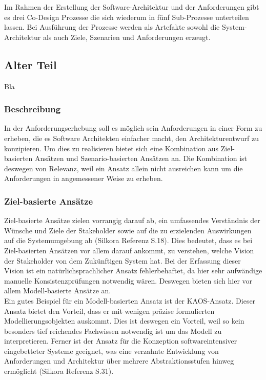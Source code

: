 Im Rahmen der Erstellung der Software-Architektur und der Anforderungen gibt es drei Co-Design Prozesse die sich wiederum in fünf Sub-Prozesse unterteilen lassen. Bei Ausführung der Prozesse werden als Artefakte sowohl die System-Architektur als auch Ziele, Szenarien und Anforderungen erzeugt. \\

\subsection{Alter Teil}
Bla\\

\subsubsection{Beschreibung}
In der Anforderungserhebung soll es m\"oglich sein Anforderungen in einer Form zu erheben, die es Software Architekten einfacher macht, den Architekturentwurf zu konzipieren. Um dies zu realisieren bietet sich eine Kombination aus Ziel-basierten Ans\"atzen und Szenario-basierten Ans\"atzen an. Die Kombination ist deswegen von Relevanz, weil ein Ansatz allein nicht ausreichen kann um die Anforderungen in angemessener Weise zu erheben.\\

\subsubsection{Ziel-basierte Ans\"atze}
Ziel-basierte Ans\"atze zielen vorrangig darauf ab, ein umfassendes Verst\"andnis der W\"unsche und Ziele der Stakeholder sowie auf die zu erzielenden Auswirkungen auf die Systemumgebung ab (Silkora Referenz S.18). Dies bedeutet, dass es bei Ziel-basierten Ans\"atzen vor allem darauf ankommt, zu verstehen, welche Vision der Stakeholder von dem Zuk\"unftigen System hat. Bei der Erfassung dieser Vision ist ein nat\"urlichsprachlicher Ansatz fehlerbehaftet, da hier sehr aufw\"andige manuelle Konsistenzpr\"ufungen notwendig w\"aren. Deswegen bieten sich hier vor allem Modell-basierte Ans\"atze an.\\

Ein gutes Beispiel f\"ur ein Modell-basierten Ansatz ist der KAOS-Ansatz. Dieser Ansatz bietet den Vorteil, dass er mit wenigen pr\"azise formulierten Modellierungsobjekten auskommt. Dies ist deswegen ein Vorteil, weil so kein besonders tief reichendes Fachwissen notwendig ist um das Modell zu interpretieren. Ferner ist der Ansatz f\"ur die Konzeption softwareintensiver eingebetteter Systeme geeignet, was eine verzahnte Entwicklung von Anforderungen und Architektur \"uber mehrere Abstraktionsstufen hinweg erm\"oglicht (Silkora Referenz S.31).\\

